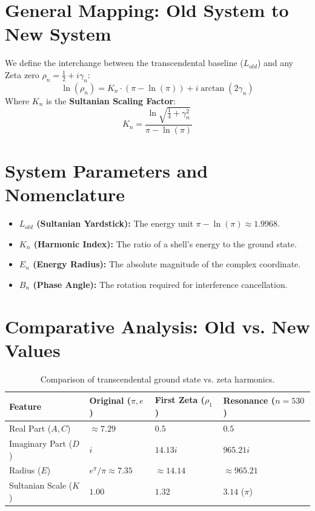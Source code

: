 \documentclass[11pt,a4paper]{article}
\begin{document}
\section{General Mapping: Old System to New System}
We define the interchange between the transcendental baseline ($L_{old}$) and any Zeta zero $\rho_n = \frac{1}{2} + i\gamma_n$:
\begin{equation}
    \ln(\rho_n) = K_n \cdot (\pi - \ln(\pi)) + i \arctan(2\gamma_n)
\end{equation}
Where $K_n$ is the \textbf{Sultanian Scaling Factor}:
\begin{equation}
    K_n = \frac{\ln \sqrt{\frac{1}{4} + \gamma_n^2}}{\pi - \ln(\pi)}
\end{equation}

\section{System Parameters and Nomenclature}
\begin{itemize}
    \item \textbf{$L_{old}$ (Sultanian Yardstick):} The energy unit $\pi - \ln(\pi) \approx 1.9968$.
    \item \textbf{$K_n$ (Harmonic Index):} The ratio of a shell's energy to the ground state.
    \item \textbf{$E_n$ (Energy Radius):} The absolute magnitude of the complex coordinate.
    \item \textbf{$B_n$ (Phase Angle):} The rotation required for interference cancellation.
\end{itemize}

\section{Comparative Analysis: Old vs. New Values}
\begin{table}[h]
\centering
\begin{tabular}{@{}llll@{}}
\toprule
\textbf{Feature} & \textbf{Original ($\pi, e$)} & \textbf{First Zeta ($\rho_1$)} & \textbf{Resonance ($n=530$)} \\ \midrule
Real Part ($A, C$) & $\approx 7.29$ & $0.5$ & $0.5$ \\
Imaginary Part ($D$) & $i$ & $14.13i$ & $965.21i$ \\
Radius ($E$) & $e^\pi / \pi \approx 7.35$ & $\approx 14.14$ & $\approx 965.21$ \\
Sultanian Scale ($K$) & $1.00$ & $1.32$ & $3.14$ ($\pi$) \\ \bottomrule
\end{tabular}
\caption{Comparison of transcendental ground state vs. zeta harmonics.}
\end{table}
\end{document}
